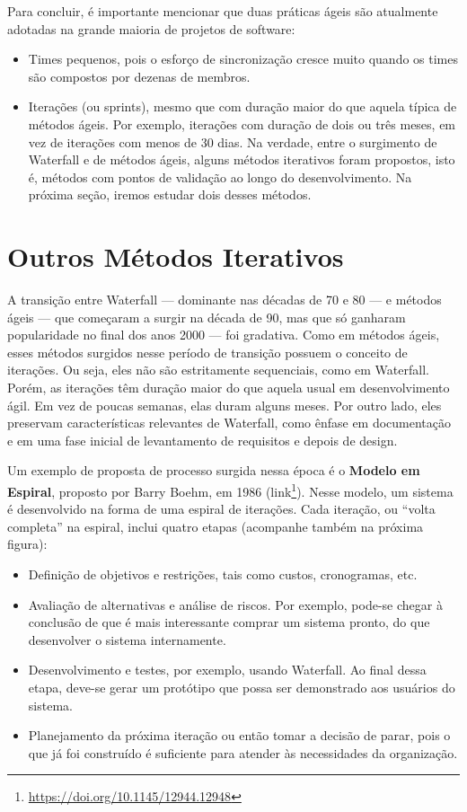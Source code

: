 \documentclass[
  11pt,
  twoside]{book}
\DeclareRobustCommand{\href}[2]{#2\footnote{\url{#1}}}
\begin{document}
Para concluir, é importante mencionar que duas práticas ágeis são
atualmente adotadas na grande maioria de projetos de software:

\begin{itemize}
\item
  Times pequenos, pois o esforço de sincronização cresce muito quando os
  times são compostos por dezenas de membros.
\item
  Iterações (ou sprints), mesmo que com duração maior do que aquela
  típica de métodos ágeis. Por exemplo, iterações com duração de dois ou
  três meses, em vez de iterações com menos de 30 dias. Na verdade,
  entre o surgimento de Waterfall e de métodos ágeis, alguns métodos
  iterativos foram propostos, isto é, métodos com pontos de validação ao
  longo do desenvolvimento. Na próxima seção, iremos estudar dois desses
  métodos.
\end{itemize}

\hypertarget{outros-muxe9todos-iterativos}{%
\section{Outros Métodos Iterativos}\label{outros-muxe9todos-iterativos}}

A transição entre Waterfall --- dominante nas décadas de 70 e 80 --- e
métodos ágeis --- que começaram a surgir na década de 90, mas que só
ganharam popularidade no final dos anos 2000 --- foi gradativa. Como em
métodos ágeis, esses métodos surgidos nesse período de transição possuem
o conceito de iterações. Ou seja, eles não são estritamente sequenciais,
como em Waterfall. Porém, as iterações têm duração maior do que aquela
usual em desenvolvimento ágil. Em vez de poucas semanas, elas duram
alguns meses. Por outro lado, eles preservam características relevantes
de Waterfall, como ênfase em documentação e em uma fase inicial de
levantamento de requisitos e depois de design.

  Um exemplo de proposta de
processo surgida nessa época é o \textbf{Modelo em Espiral}, proposto
por Barry Boehm, em 1986
(\href{https://doi.org/10.1145/12944.12948}{link}). Nesse modelo, um
sistema é desenvolvido na forma de uma espiral de iterações. Cada
iteração, ou ``volta completa'' na espiral, inclui quatro etapas
(acompanhe também na próxima figura):

\begin{itemize}
\item
  Definição de objetivos e restrições, tais como custos, cronogramas,
  etc.
\item
  Avaliação de alternativas e análise de riscos. Por exemplo, pode-se
  chegar à conclusão de que é mais interessante comprar um sistema
  pronto, do que desenvolver o sistema internamente.
\item
  Desenvolvimento e testes, por exemplo, usando Waterfall. Ao final
  dessa etapa, deve-se gerar um protótipo que possa ser demonstrado aos
  usuários do sistema.
\item
  Planejamento da próxima iteração ou então tomar a decisão de parar,
  pois o que já foi construído é suficiente para atender às necessidades
  da organização.
\end{itemize}
\end{document}
